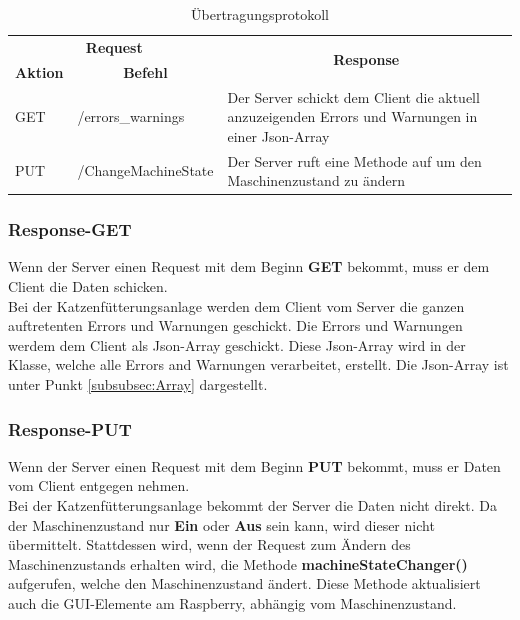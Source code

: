 \begin{table}[htb]
\centering
\begin{tabular}{|l|l|p{300pt}|}
\hline
\multicolumn{2}{|c|}{\textbf{Request}}                                    & \multicolumn{1}{c|}{\multirow{2}{*}{\textbf{Response}}}                                          \\ \cline{1-2}
\multicolumn{1}{|c|}{\textbf{Aktion}} & \multicolumn{1}{c|}{\textbf{Befehl}} & \multicolumn{1}{c|}{}                                                                            \\ \hline
GET                                   & /errors\_warnings                 & Der Server schickt dem Client die aktuell anzuzeigenden Errors und Warnungen in einer Json-Array \\ \hline
PUT                                   & /ChangeMachineState               & Der Server ruft eine Methode auf um den Maschinenzustand zu ändern                               \\ \hline
\end{tabular}
\caption{Übertragungsprotokoll}
\label{Übertragungsprotokoll}
\end{table}

\newpage

\subsubsection{Response-GET}
Wenn der Server einen Request mit dem Beginn \textbf{GET} bekommt, muss er dem Client die Daten schicken. 
\\ Bei der Katzenfütterungsanlage werden dem Client vom Server die ganzen auftretenten Errors und Warnungen geschickt. Die Errors und Warnungen werdem dem Client als Json-Array geschickt. Diese Json-Array wird in der Klasse, welche alle Errors and Warnungen verarbeitet, erstellt. Die Json-Array ist unter Punkt \ref{subsubsec:Array} dargestellt. 

\subsubsection{Response-PUT}
Wenn der Server einen Request mit dem Beginn \textbf{PUT} bekommt, muss er Daten vom Client entgegen nehmen.
\\ Bei der Katzenfütterungsanlage bekommt der Server die Daten nicht direkt. Da der Maschinenzustand nur \textbf{Ein} oder \textbf{Aus} sein kann, wird dieser nicht übermittelt. Stattdessen wird, wenn der Request zum Ändern des Maschinenzustands erhalten wird, die Methode \textbf{machineStateChanger()} aufgerufen, welche den Maschinenzustand ändert. Diese Methode aktualisiert auch die GUI-Elemente am Raspberry, abhängig vom Maschinenzustand. 

